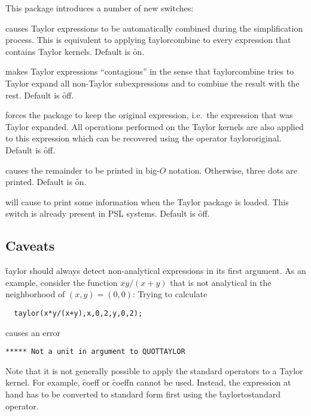 This package introduces a number of new switches:
\begin{description}

\item[\sw{taylorautocombine}] \hypertarget{switch:TAYLORAUTOCOMBINE}{}causes
    Taylor expressions to be automatically combined during the simplification
    process.  This is equivalent to applying \f{taylorcombine} to
    every expression that contains Taylor kernels.
    Default is \f{on}.

\item[\sw{taylorautoexpand}] \hypertarget{switch:taylorautoexpand}{} makes Taylor expressions ``contagious''
    in the sense that \f{taylorcombine} tries to Taylor expand
    all non-Taylor subexpressions and to combine the result with the
    rest. Default is \f{off}.

\hypertarget{switch:TAYLORKEEPORIGINAL}{}
\item[\sw{taylorkeeporiginal}] forces the
    package to keep the original expression, i.e.\ the expression
    that was Taylor expanded.  All operations performed on the
    Taylor kernels are also applied to this expression  which can
    be recovered using the operator \f{taylororiginal}.
    Default is \f{off}.

\hypertarget{switch:TAYLORPRINTORDER}{}
\item[\sw{taylorprintorder}] causes the
    remainder to be printed in big-$O$ notation.  Otherwise, three
    dots are printed. Default is \f{on}.

\item[\sw{verboseload}] will cause
    \REDUCE{} to print some information when the Taylor package is
    loaded.  This switch is already present in \textsf{PSL} systems.
    Default is \f{off}.

\end{description}

\subsection{Caveats}

\f{taylor} should always detect non-analytical expressions in
its first argument. As an example, consider the function $xy/(x+y)$
that is not analytical in the neighborhood of $(x,y) = (0,0)$: Trying
to calculate
\begin{verbatim}
  taylor(x*y/(x+y),x,0,2,y,0,2);
\end{verbatim}
causes an error
\begin{verbatim}
***** Not a unit in argument to QUOTTAYLOR
\end{verbatim}
Note that it is not generally possible to apply the standard \REDUCE{}
operators to a Taylor kernel. For example, \f{coeff}
or \f{coeffn} cannot be used. Instead, the expression at hand has
to be converted to standard form first using the \f{taylortostandard}
operator.

